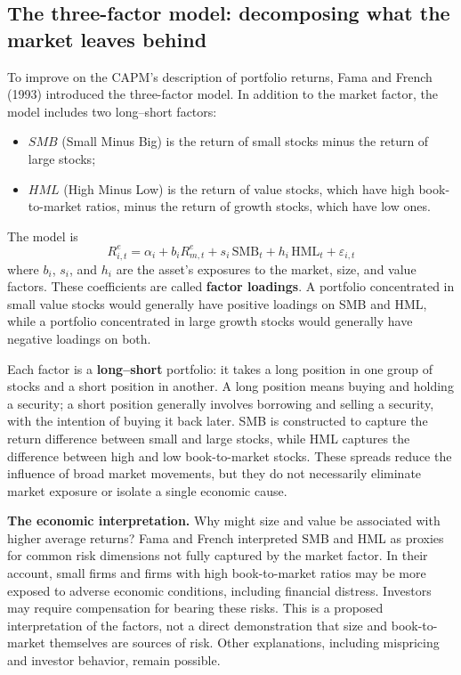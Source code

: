 \subsection{The three-factor model: decomposing what the market leaves behind}
\label{sec:03-factors}
To improve on the CAPM's description of portfolio returns, Fama and French (1993) introduced the three-factor model. In addition to the market factor, the model includes two long--short factors:
\begin{itemize}
  \item $SMB$ (Small Minus Big) is the return of small stocks minus the return of large stocks;
  \item $HML$ (High Minus Low) is the return of value stocks, which have high book-to-market ratios, minus the return of growth stocks, which have low ones.
\end{itemize}
The model is
\begin{equation}
  R^{e}_{i,t} = \alpha_i + b_i R^{e}_{m,t} + s_i \,\mathrm{SMB}_t + h_i \,\mathrm{HML}_t + \varepsilon_{i,t}
  \label{eq:03-ff3}
\end{equation}
where $b_i$, $s_i$, and $h_i$ are the asset's exposures to the market, size, and value factors. These coefficients are called \textbf{factor loadings}. A portfolio concentrated in small value stocks would generally have positive loadings on SMB and HML, while a portfolio concentrated in large growth stocks would generally have negative loadings on both.

Each factor is a \textbf{long--short} portfolio: it takes a long position in one group of stocks and a short position in another. A long position means buying and holding a security; a short position generally involves borrowing and selling a security, with the intention of buying it back later. SMB is constructed to capture the return difference between small and large stocks, while HML captures the difference between high and low book-to-market stocks. These spreads reduce the influence of broad market movements, but they do not necessarily eliminate market exposure or isolate a single economic cause.

\textbf{The economic interpretation.} Why might size and value be associated with higher average returns? Fama and French interpreted SMB and HML as proxies for common risk dimensions not fully captured by the market factor. In their account, small firms and firms with high book-to-market ratios may be more exposed to adverse economic conditions, including financial distress. Investors may require compensation for bearing these risks. This is a proposed interpretation of the factors, not a direct demonstration that size and book-to-market themselves are sources of risk. Other explanations, including mispricing and investor behavior, remain possible.

